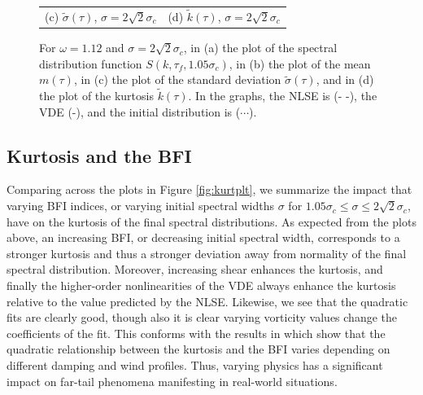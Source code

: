 \documentclass[a4paper,11pt]{article}
\begin{document}
\begin{figure}[!ht]
\begin{tabular}{cc}
(c) $\tilde{\sigma}(\tau)$, $\sigma = 2\sqrt{2}\sigma_{c}$ & (d) $\tilde{k}(\tau)$, $\sigma = 2\sqrt{2}\sigma_{c}$
\end{tabular}
\caption{For $\omega=1.12$ and $\sigma=2\sqrt{2} \sigma_{c}$, in (a) the plot of the spectral distribution function $S(k,\tau_{f},1.05\sigma_{c})$, in (b) the plot of the mean $m(\tau)$, in (c) the plot of the standard deviation $\tilde{\sigma}(\tau)$, and in (d) the plot of the kurtosis $\tilde{k}(\tau)$.  In the graphs, the NLSE is (- -), the VDE (-), and the initial distribution is ($\cdots$).}
\label{fig:stbleom1wide}
\end{figure}

\subsection*{Kurtosis and the BFI}
Comparing across the plots in Figure \ref{fig:kurtplt}, we summarize the impact that varying BFI indices, or varying initial spectral widths $\sigma$ for $1.05\sigma_{c}\leq \sigma \leq 2\sqrt{2}\sigma_{c}$, have on the kurtosis of the final spectral distributions.  As expected from the plots above, an increasing BFI, or decreasing initial spectral width, corresponds to a stronger kurtosis and thus a stronger deviation away from normality of the final spectral distribution.  Moreover, increasing shear enhances the kurtosis, and finally the higher-order nonlinearities of the VDE always enhance the kurtosis relative to the value predicted by the NLSE.  Likewise, we see that the quadratic fits are clearly good, though also it is clear varying vorticity values change the coefficients of the fit.  This conforms with the results in \cite{eeltink} which show that the quadratic relationship between the kurtosis and the BFI varies depending on different damping and wind profiles.  Thus, varying physics has a significant impact on far-tail phenomena manifesting in real-world situations.  
\end{document}
